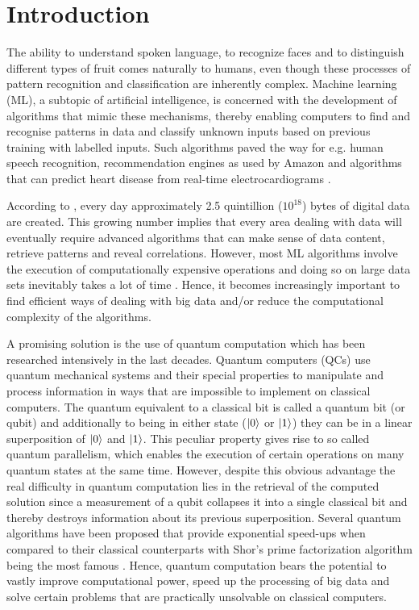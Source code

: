 \documentclass[a4paper]{article}
\newcommand*{\0}{$\ket{0}$}
\newcommand*{\1}{$\ket{1}$}
\begin{document}
\section{Introduction}
\label{sec:introduction}


The ability to understand spoken language, to recognize faces and to distinguish different types of fruit comes naturally to humans, even though these processes of pattern recognition and classification are inherently complex. Machine learning (ML), a subtopic of artificial intelligence, is concerned with the development of algorithms that mimic these mechanisms, thereby enabling computers to find and recognise patterns in data and classify unknown inputs based on previous training with labelled inputs. Such algorithms paved the way for e.g. human speech recognition, recommendation engines as used by Amazon and algorithms that can predict heart disease from real-time electrocardiograms \citep{acharya2015integrated}.

According to \cite*{bigdata}, every day approximately 2.5 quintillion (${10}^{18}$) bytes of digital data are created. This growing number implies that every area dealing with data will eventually require advanced algorithms that can make sense of data content, retrieve patterns and reveal correlations. However, most ML algorithms involve the execution of computationally expensive operations and doing so on large data sets inevitably takes a lot of time \citep{bekkerman2011scaling}. Hence, it becomes increasingly important to find efficient ways of dealing with big data and/or reduce the computational complexity of the algorithms.

A promising solution is the use of quantum computation which has been researched intensively in the last decades. Quantum computers (QCs) use quantum mechanical systems and their special properties to manipulate and process information in ways that are impossible to implement on classical computers. The quantum equivalent to a classical bit is called a quantum bit (or qubit) and additionally to being in either state (\0 or \1) they can be in a linear superposition of \0 and \1. This peculiar property gives rise to so called quantum parallelism, which enables the execution of certain operations on many quantum states at the same time. However, despite this obvious advantage the real difficulty in quantum computation lies in the retrieval of the computed solution since a measurement of a qubit collapses it into a single classical bit and thereby destroys information about its previous superposition. Several quantum algorithms have been proposed that provide exponential speed-ups when compared to their classical counterparts with Shor's prime factorization algorithm being the most famous \citep{shor1994}. Hence, quantum computation bears the potential to vastly improve computational power, speed up the processing of big data and solve certain problems that are practically unsolvable on classical computers. 
\end{document}
